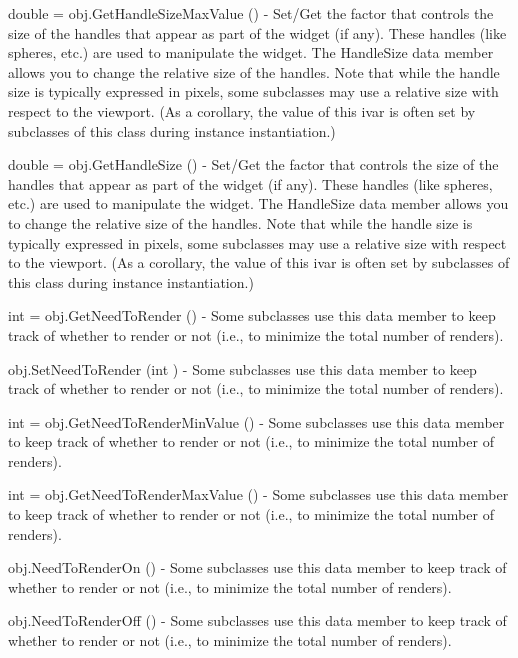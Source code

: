 \begin{DoxyItemize}
\item {\ttfamily double = obj.\-Get\-Handle\-Size\-Max\-Value ()} -\/ Set/\-Get the factor that controls the size of the handles that appear as part of the widget (if any). These handles (like spheres, etc.) are used to manipulate the widget. The Handle\-Size data member allows you to change the relative size of the handles. Note that while the handle size is typically expressed in pixels, some subclasses may use a relative size with respect to the viewport. (As a corollary, the value of this ivar is often set by subclasses of this class during instance instantiation.)  
\item {\ttfamily double = obj.\-Get\-Handle\-Size ()} -\/ Set/\-Get the factor that controls the size of the handles that appear as part of the widget (if any). These handles (like spheres, etc.) are used to manipulate the widget. The Handle\-Size data member allows you to change the relative size of the handles. Note that while the handle size is typically expressed in pixels, some subclasses may use a relative size with respect to the viewport. (As a corollary, the value of this ivar is often set by subclasses of this class during instance instantiation.)  
\item {\ttfamily int = obj.\-Get\-Need\-To\-Render ()} -\/ Some subclasses use this data member to keep track of whether to render or not (i.\-e., to minimize the total number of renders).  
\item {\ttfamily obj.\-Set\-Need\-To\-Render (int )} -\/ Some subclasses use this data member to keep track of whether to render or not (i.\-e., to minimize the total number of renders).  
\item {\ttfamily int = obj.\-Get\-Need\-To\-Render\-Min\-Value ()} -\/ Some subclasses use this data member to keep track of whether to render or not (i.\-e., to minimize the total number of renders).  
\item {\ttfamily int = obj.\-Get\-Need\-To\-Render\-Max\-Value ()} -\/ Some subclasses use this data member to keep track of whether to render or not (i.\-e., to minimize the total number of renders).  
\item {\ttfamily obj.\-Need\-To\-Render\-On ()} -\/ Some subclasses use this data member to keep track of whether to render or not (i.\-e., to minimize the total number of renders).  
\item {\ttfamily obj.\-Need\-To\-Render\-Off ()} -\/ Some subclasses use this data member to keep track of whether to render or not (i.\-e., to minimize the total number of renders).  

\end{DoxyItemize}
